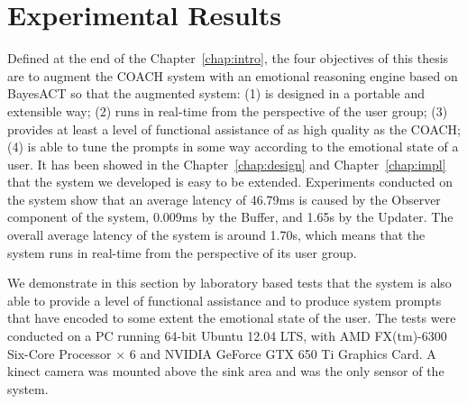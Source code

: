 \chapter{Experimental Results}
\label{chap:result}

Defined at the end of the Chapter~\ref{chap:intro}, the four objectives of this thesis are to augment the COACH system with an emotional reasoning engine based on BayesACT so that the augmented system: (1) is designed in a portable and extensible way; (2) runs in real-time from the perspective of the user group; (3) provides at least a level of functional assistance of as high quality as the COACH; (4) is able to tune the prompts in some way according to the emotional state of a user. It has been showed in the Chapter~\ref{chap:design} and Chapter~\ref{chap:impl} that the system we developed is easy to be extended. Experiments conducted on the system show that an average latency of 46.79ms is caused by the Observer component of the system, 0.009ms by the Buffer, and 1.65s by the Updater. The overall average latency of the system is around 1.70s, which means that the system runs in real-time from the perspective of its user group. 

We demonstrate in this section by laboratory based tests that the system is also able to provide a level of functional assistance and to produce system prompts that have encoded to some extent the emotional state of the user. The tests were conducted on a PC running 64-bit Ubuntu 12.04 LTS, with AMD FX(tm)-6300 Six-Core Processor × 6 and NVIDIA GeForce GTX 650 Ti Graphics Card. A kinect camera was mounted above the sink area and was the only sensor of the system.

